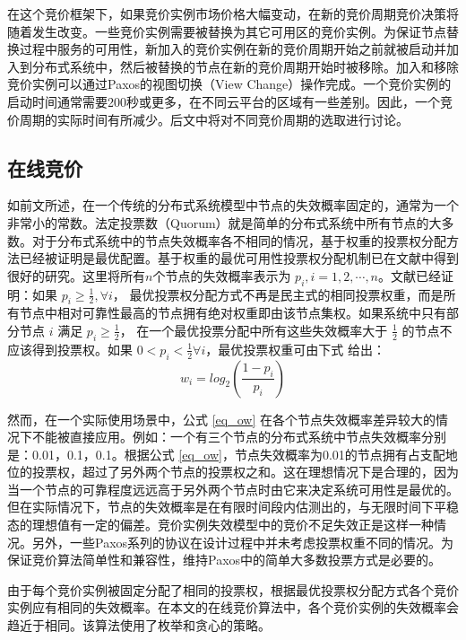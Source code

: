 在这个竞价框架下，如果竞价实例市场价格大幅变动，在新的竞价周期竞价决策将随着发生改变。一些竞价实例需要被替换为其它可用区的竞价实例。为保证节点替换过程中服务的可用性，新加入的竞价实例在新的竞价周期开始之前就被启动并加入到分布式系统中，然后被替换的节点在新的竞价周期开始时被移除。加入和移除竞价实例可以通过Paxos的视图切换（View Change）操作完成。一个竞价实例的启动时间通常需要200秒或更多，在不同云平台的区域有一些差别\cite{6253534}。因此，一个竞价周期的实际时间有所减少。后文中将对不同竞价周期的选取进行讨论。

\subsection{在线竞价}
\label{subsec:jupiter-bidding}
如前文所述，在一个传统的分布式系统模型中节点的失效概率固定的，通常为一个非常小的常数。法定投票数（Quorum）就是简单的分布式系统中所有节点的大多数。对于分布式系统中的节点失效概率各不相同的情况，基于权重的投票权分配方法已经被证明是最优配置。基于权重的最优可用性投票权分配机制已在文献\cite{25789, 262589, Amir1998223}中得到很好的研究。这里将所有$n$个节点的失效概率表示为 $p_i, i = 1, 2, \cdots, n$。文献\cite{Amir1998223}已经证明：如果 $p_i \geq \frac{1}{2}, \forall i$， 最优投票权分配方式不再是民主式的相同投票权重，而是所有节点中相对可靠性最高的节点拥有绝对权重即由该节点集权。如果系统中只有部分节点 $i$ 满足 $p_i \geq \frac{1}{2}$， 在一个最优投票分配中所有这些失效概率大于 $\frac{1}{2}$ 的节点不应该得到投票权。如果 $0 < p_i < \frac{1}{2} \forall i$，最优投票权重可由下式 \cite{262589, 25789}给出：
\begin{equation}\label{eq_ow}
w_i = log_2(\frac{1-p_i}{p_i})
\end{equation}

然而，在一个实际使用场景中，公式 \eqref{eq_ow} 在各个节点失效概率差异较大的情况下不能被直接应用。例如：一个有三个节点的分布式系统中节点失效概率分别是：0.01，0.1，0.1。根据公式 \eqref{eq_ow}，节点失效概率为0.01的节点拥有占支配地位的投票权，超过了另外两个节点的投票权之和。这在理想情况下是合理的，因为当一个节点的可靠程度远远高于另外两个节点时由它来决定系统可用性是最优的。但在实际情况下，节点的失效概率是在有限时间段内估测出的，与无限时间下平稳态的理想值有一定的偏差。竞价实例失效模型中的竞价不足失效正是这样一种情况。另外，一些Paxos系列的协议在设计过程中并未考虑投票权重不同的情况。为保证竞价算法简单性和兼容性，维持Paxos中的简单大多数投票方式是必要的。

由于每个竞价实例被固定分配了相同的投票权，根据最优投票权分配方式各个竞价实例应有相同的失效概率。在本文的在线竞价算法中，各个竞价实例的失效概率会趋近于相同。该算法使用了枚举和贪心的策略。

